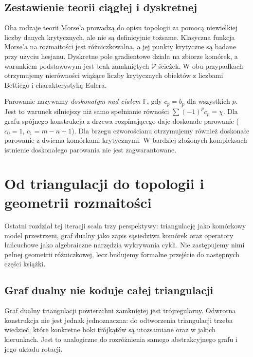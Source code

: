 \section{Zestawienie teorii ciągłej i dyskretnej}
\label{sec:tg-morse-bridge}

Oba rodzaje teorii Morse'a prowadzą do opisu topologii
za pomocą niewielkiej liczby danych krytycznych,
ale nie są definicyjnie tożsame. Klasyczna funkcja
Morse'a na rozmaitości jest różniczkowalna, a jej
punkty krytyczne są badane przy użyciu hesjanu.
Dyskretne pole gradientowe działa na zbiorze komórek,
a warunkiem podstawowym jest brak zamkniętych
$\mathcal V$-ścieżek. W obu przypadkach otrzymujemy
nierówności wiążące liczby krytycznych obiektów
z liczbami Bettiego i charakterystyką Eulera.

\begin{uwaga}
Parowanie nazywamy \emph{doskonałym nad ciałem}
$\mathbb F$, gdy $c_p=b_p$ dla wszystkich $p$.
Jest to warunek silniejszy niż samo spełnianie równości
$\sum(-1)^pc_p=\chi$. Dla grafu spójnego konstrukcja
z drzewa rozpinającego daje doskonałe parowanie
($c_0=1$, $c_1=m-n+1$). Dla brzegu czworościanu
otrzymujemy również doskonałe parowanie z dwiema
komórkami krytycznymi. W bardziej złożonych
kompleksach istnienie doskonałego parowania nie jest
zagwarantowane.
\end{uwaga}

\chapter{Od triangulacji do topologii i geometrii rozmaitości}
\label{ch:tg-most-geometria}

Ostatni rozdział tej iteracji scala trzy perspektywy:
triangulację jako komórkowy model przestrzeni,
graf dualny jako zapis sąsiedztwa komórek oraz
operatory łańcuchowe jako algebraiczne narzędzia
wykrywania cykli. Nie zastępujemy nimi pełnej
geometrii różniczkowej, lecz budujemy formalne
przejście do następnych części książki.

\section{Graf dualny nie koduje całej triangulacji}
\label{sec:tg-limit-dual}

Graf dualny triangulacji powierzchni zamkniętej jest
trójregularny. Odwrotna konstrukcja nie jest jednak
jednoznaczna: do odtworzenia triangulacji trzeba wiedzieć,
które konkretne boki trójkątów są utożsamiane oraz
w jakich kierunkach. Jest to analogiczne do rozróżnienia
samego abstrakcyjnego grafu i jego układu rotacji.

